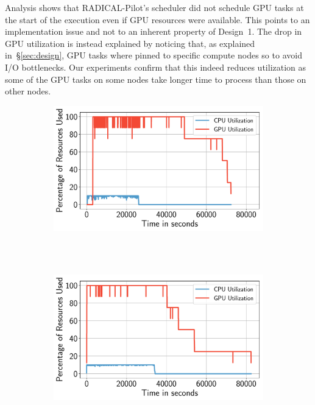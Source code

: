 Analysis shows that RADICAL-Pilot's scheduler did not schedule GPU tasks at the start of the execution even if GPU resources were available.
This points to an implementation issue and not to an inherent property of Design~1.
The drop in GPU utilization is instead explained by noticing that, as explained in~\S\ref{sec:design}, GPU tasks where pinned to specific compute nodes so to avoid I/O bottlenecks.
Our experiments confirm that this indeed reduces utilization as some of the GPU tasks on some nodes take longer time to process than those on other nodes.

\begin{figure}[H]
    \centering
    \begin{subfigure}[b]{0.75\textwidth}
        \includegraphics[width=\textwidth]{figures/designs/Design1Utilization.pdf}
        \caption{}
        \label{fig:design1util}
    \end{subfigure}\\
    ~ 
    \begin{subfigure}[b]{0.75\textwidth}
        \includegraphics[width=\textwidth]{figures/designs/Design2Utilization.pdf}

\end{subfigure}
\end{figure}
